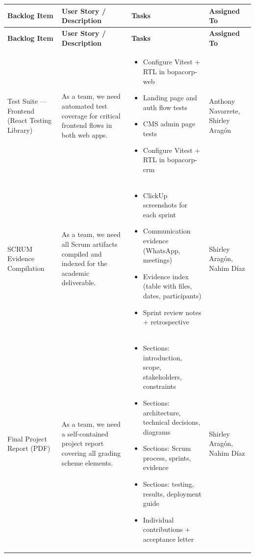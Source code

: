\documentclass[letterpaper%
, oneside%
, 12pt%
, memoireprojet%
, english%
,creativecommons,hyperref, withAlgo2e %
]{thETS}
\begin{document}
\begingroup
\setlength{\LTleft}{-1.2cm plus -1fill}
\setlength{\LTright}{\LTleft}
\begin{longtable}{|p{3.2cm}|p{4.4cm}|p{5.4cm}|p{3.0cm}|}
\hline
\textbf{Backlog Item} & \textbf{User Story / Description} & \textbf{Tasks} & \textbf{Assigned To} \\ \hline
\endfirsthead
\hline
\textbf{Backlog Item} & \textbf{User Story / Description} & \textbf{Tasks} & \textbf{Assigned To} \\ \hline
\endhead
Test Suite — Frontend (React Testing Library) & As a team, we need automated test coverage for critical frontend flows in both web apps. & \begin{itemize}\setlength{\itemsep}{2pt}
    \item Configure Vitest + RTL in bopacorp-web
    \item Landing page and auth flow tests
    \item CMS admin page tests
    \item Configure Vitest + RTL in bopacorp-crm
\end{itemize} & Anthony Navarrete, Shirley Aragón \\ \hline

SCRUM Evidence Compilation & As a team, we need all Scrum artifacts compiled and indexed for the academic deliverable. & \begin{itemize}\setlength{\itemsep}{2pt}
    \item ClickUp screenshots for each sprint
    \item Communication evidence (WhatsApp, meetings)
    \item Evidence index (table with files, dates, participants)
    \item Sprint review notes + retrospective
\end{itemize} & Shirley Aragón, Nahim Díaz \\ \hline

Final Project Report (PDF) & As a team, we need a self-contained project report covering all grading scheme elements. & \begin{itemize}\setlength{\itemsep}{2pt}
    \item Sections: introduction, scope, stakeholders, constraints
    \item Sections: architecture, technical decisions, diagrams
    \item Sections: Scrum process, sprints, evidence
    \item Sections: testing, results, deployment guide
    \item Individual contributions + acceptance letter
\end{itemize} & Shirley Aragón, Nahim Díaz \\ \hline


\end{longtable}
\end{document}
